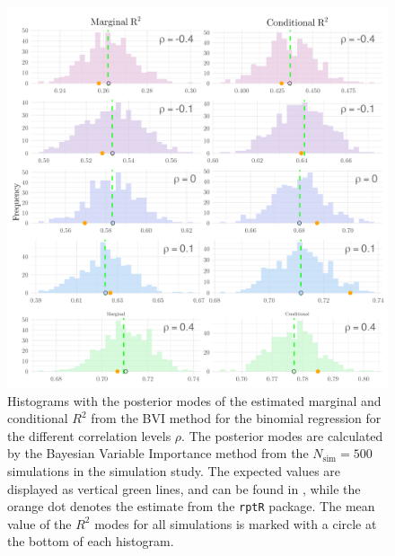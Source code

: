 \begin{figure}[H]
  \centering
  \includegraphics[width=1\linewidth]{Figures/Simulation study/R2_combined_logit.png}
  \caption[Marginal and conditional $R^2$ in binomial GLMM]{Histograms with the posterior modes of the estimated marginal and conditional $R^2$ from the BVI method for the binomial regression for the different correlation levels $\rho$. The posterior modes are calculated by the Bayesian Variable Importance method from the $N_{\text{sim}}=500$ simulations in the simulation study. The expected values are displayed as vertical green lines, and can be found in , while the orange dot denotes the estimate from the \texttt{rptR} package. The mean value of the $R^2$ modes for all simulations is marked with a circle at the bottom of each histogram.}
  \label{fig:r2_combined_logit}
\end{figure}

